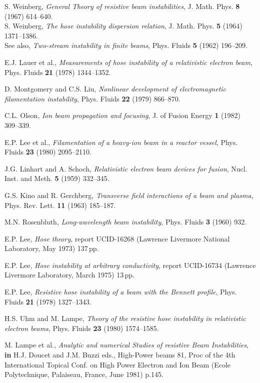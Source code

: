 \documentclass [12pt,a4paper,     ]{report} %
\begin{document}
\begin{enumerate}
 S. Weinberg, \emph{General Theory of resistive beam instabilities}, J. Math. Phys. {\bf 8} (1967) 614--640.\\
S. Weinberg, \emph{The hose instability dispersion relation}, J. Math. Phys. {\bf 5} (1964) 1371--1386.\\
See also, \emph{Two-stream instability in finite beams}, Phys. Fluids {\bf 5} (1962) 196--209.

 E.J. Lauer et al., \emph{Measurements of hose instability of a relativistic electron beam}, Phys. Fluids {\bf 21} (1978) 1344--1352.

  D. Montgomery and C.S. Liu, \emph{Nonlinear development of electromagnetic filamentation instability}, Phys. Fluids {\bf 22} (1979) 866--870.

 C.L. Olson, \emph{Ion beam propagation and focusing}, J. of Fusion Energy {\bf 1} (1982) 309--339.

 E.P. Lee et al., \emph{Filamentation of a heavy-ion beam in a reactor vessel}, Phys. Fluids {\bf 23} (1980) 2095--2110.

 J.G. Linhart and A. Schoch, \emph{Relativistic electron beam devices for fusion}, Nucl. Inst. and Meth. {\bf 5} (1959) 332--345.

 G.S. Kino and R. Gerchberg, \emph{Transverse field interactions of a beam and plasma}, Phys. Rev. Lett. {\bf 11} (1963) 185--187.

 M.N. Rosenbluth, \emph{Long-wavelength beam instability}, Phys. Fluids {\bf 3} (1960) 932.

 E.P. Lee, \emph{Hose theory}, report UCID-16268 (Lawrence Livermore National Laboratory, May 1973) 137\,pp.

 E.P. Lee, \emph{Hose instability at arbitrary conductivity},  report UCID-16734 (Lawrence Livermore Laboratory, March 1975) 13\,pp.

 E.P. Lee, \emph{Resistive hose instability of a beam with the Bennett profile}, Phys. Fluids {\bf 21} (1978) 1327--1343.

 H.S. Uhm and M. Lampe, \emph{Theory of the resistive hose instability in relativistic electron beams}, Phys. Fluids {\bf 23} (1980) 1574--1585.

 M. Lampe et al., \emph{Analytic and numerical Studies of resistive Beam Instabilities}, {\bf in} H.J. Doucet and J.M. Buzzi eds., High-Power beams 81, Proc of the 4th International Topical Conf. on High Power Electron and Ion Beam (Ecole Polytechnique, Palaiseau, France, June 1981) p.145.


\end{enumerate}
\end{document}
